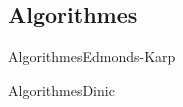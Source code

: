 \subsection{Algorithmes}
\begin{frame}{Algorithmes}{Edmonds-Karp}
\end{frame}

\begin{frame}{Algorithmes}{Dinic}
\end{frame}